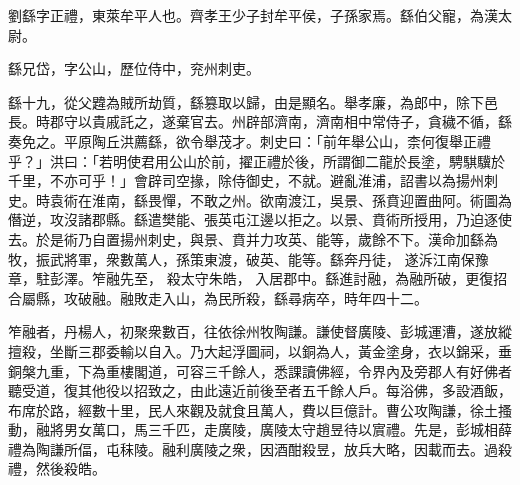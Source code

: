 \begin{pinyinscope}
 
 
 劉繇字正禮，東萊牟平人也。齊孝王少子封牟平侯，子孫家焉。繇伯父寵，為漢太尉。
 
 
 繇兄岱，字公山，歷位侍中，兖州刺吏。
 
 
繇十九，從父韙為賊所劫質，繇篡取以歸，由是顯名。舉孝廉，為郎中，除下邑長。時郡守以貴戚託之，遂棄官去。州辟部濟南，濟南相中常侍子，貪穢不循，繇奏免之。平原陶丘洪薦繇，欲令舉茂才。刺史曰：「前年舉公山，柰何復舉正禮乎？」洪曰：「若明使君用公山於前，擢正禮於後，所謂御二龍於長塗，騁騏驥於千里，不亦可乎！」會辟司空掾，除侍御史，不就。避亂淮浦，詔書以為揚州刺史。時袁術在淮南，繇畏憚，不敢之州。欲南渡江，吳景、孫賁迎置曲阿。術圖為僭逆，攻沒諸郡縣。繇遣樊能、張英屯江邊以拒之。以景、賁術所授用，乃迫逐使去。於是術乃自置揚州刺史，與景、賁并力攻英、能等，歲餘不下。漢命加繇為牧，振武將軍，衆數萬人，孫策東渡，破英、能等。繇奔丹徒，
 遂泝江南保豫章，駐彭澤。笮融先至，
 殺太守朱皓，
 入居郡中。繇進討融，為融所破，更復招合屬縣，攻破融。融敗走入山，為民所殺，繇尋病卒，時年四十二。
 
 
 
 
 笮融者，丹楊人，初聚衆數百，往依徐州牧陶謙。謙使督廣陵、彭城運漕，遂放縱擅殺，坐斷三郡委輸以自入。乃大起浮圖祠，以銅為人，黃金塗身，衣以錦采，垂銅槃九重，下為重樓閣道，可容三千餘人，悉課讀佛經，令界內及旁郡人有好佛者聽受道，復其他役以招致之，由此遠近前後至者五千餘人戶。每浴佛，多設酒飯，布席於路，經數十里，民人來觀及就食且萬人，費以巨億計。曹公攻陶謙，徐土搔動，融將男女萬口，馬三千匹，走廣陵，廣陵太守趙昱待以賔禮。先是，彭城相薛禮為陶謙所偪，屯秣陵。融利廣陵之衆，因酒酣殺昱，放兵大略，因載而去。過殺禮，然後殺皓。
 

\end{pinyinscope}
